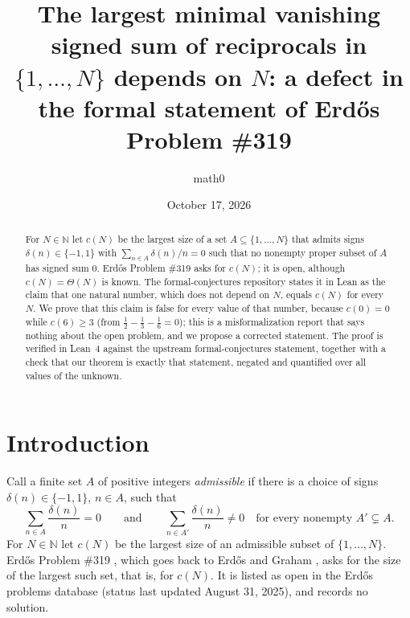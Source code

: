 \documentclass[11pt]{amsart}
\title[The formal statement of Erd\H{o}s Problem \#319 is false]{The largest minimal vanishing signed sum of reciprocals in $\{1,\dots,N\}$ depends on $N$: a defect in the formal statement of Erd\H{o}s Problem \#319}
\author{math0}
\date{October 17, 2026}
\theoremstyle{plain}
\theoremstyle{definition}
\newcommand{\N}{\mathbb{N}}
\begin{document}
\begin{abstract}
For $N\in\N$ let $c(N)$ be the largest size of a set $A\subseteq\{1,\dots,N\}$ that admits signs $\delta(n)\in\{-1,1\}$ with $\sum_{n\in A}\delta(n)/n=0$ such that no nonempty proper subset of $A$ has signed sum $0$. Erd\H{o}s Problem \#319 asks for $c(N)$; it is open, although $c(N)=\Theta(N)$ is known. The formal-conjectures repository states it in Lean as the claim that one natural number, which does not depend on $N$, equals $c(N)$ for every $N$. We prove that this claim is false for every value of that number, because $c(0)=0$ while $c(6)\ge 3$ (from $\frac12-\frac13-\frac16=0$); this is a misformalization report that says nothing about the open problem, and we propose a corrected statement. The proof is verified in Lean~4 against the upstream formal-conjectures statement, together with a check that our theorem is exactly that statement, negated and quantified over all values of the unknown.
\end{abstract}
\maketitle

\section{Introduction}

Call a finite set $A$ of positive integers \emph{admissible} if there is a choice of signs $\delta(n)\in\{-1,1\}$, $n\in A$, such that
\begin{equation}\label{eq:adm}
\sum_{n\in A}\frac{\delta(n)}{n}=0
\qquad\text{and}\qquad
\sum_{n\in A'}\frac{\delta(n)}{n}\neq 0\quad\text{for every nonempty } A'\subsetneq A .
\end{equation}
For $N\in\N$ let $c(N)$ be the largest size of an admissible subset of $\{1,\dots,N\}$. Erd\H{o}s Problem \#319 \cite{EP319}, which goes back to Erd\H{o}s and Graham \cite{ErGr80}, asks for the size of the largest such set, that is, for $c(N)$. It is listed as open in the Erd\H{o}s problems database \cite{EPdb} (status last updated August 31, 2025), and \cite{EP319} records no solution.
\end{document}

